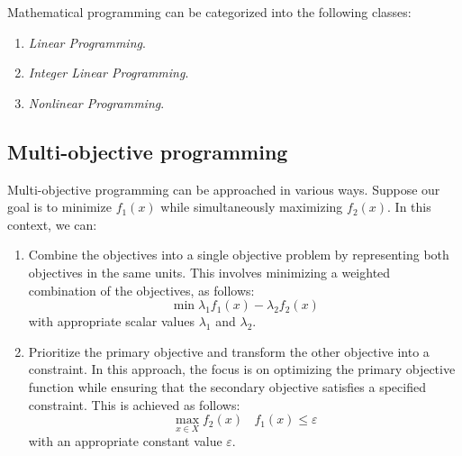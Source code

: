Mathematical programming can be categorized into the following classes:
\begin{enumerate}
    \item \textit{Linear Programming}.
    \item \textit{Integer Linear Programming}.
    \item \textit{Nonlinear Programming}. 
\end{enumerate}

\subsection{Multi-objective programming}
Multi-objective programming can be approached in various ways. 
Suppose our goal is to minimize $f_1(x)$ while simultaneously maximizing $f_2(x)$. 
In this context, we can:
\begin{enumerate}
    \item Combine the objectives into a single objective problem by representing both objectives in the same units. 
        This involves minimizing a weighted combination of the objectives, as follows:
        \[\min{\lambda_1f_1(x)-\lambda_2f_2(x)}\]
        with appropriate scalar values $\lambda_1$ and $\lambda_2$.
    \item Prioritize the primary objective and transform the other objective into a constraint. 
        In this approach, the focus is on optimizing the primary objective function while ensuring that the secondary objective satisfies a specified constraint. 
        This is achieved as follows:
        \[\max_{x \in X}f_2(x) \:\:\:\: f_1(x)\leq \varepsilon\]
        with an appropriate constant value $\varepsilon$. 
\end{enumerate}